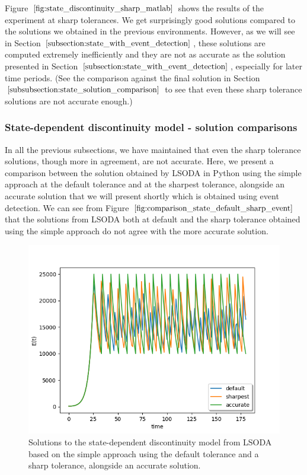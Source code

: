 Figure $\ref{fig:state_discontinuity_sharp_matlab}$ shows the results of the experiment at sharp tolerances. We get surprisingly good solutions compared to the solutions we obtained in the previous environments. However, as we will see in Section $\ref{subsection:state_with_event_detection}$, these solutions are computed extremely inefficiently and they are not as accurate as the solution presented in Section $\ref{subsection:state_with_event_detection}$, especially for later time periods. (See the comparison against the final solution in Section $\ref{subsubsection:state_solution_comparison}$ to see that even these sharp tolerance solutions are not accurate enough.)


\subsubsection{State-dependent discontinuity model - solution comparisons}
\label{subsubsection:state_solution_comparison}
In all the previous subsections, we have maintained that even the sharp tolerance solutions, though more in agreement, are not accurate. Here, we present a comparison between the solution obtained by LSODA in Python using the simple approach at the default tolerance and at the sharpest tolerance, alongside an accurate solution that we will present shortly which is obtained using event detection. We can see from Figure $\ref{fig:comparison_state_default_sharp_event}$ that the solutions from LSODA both at default and the sharp tolerance obtained using the simple approach do not agree with the more accurate solution. 

\begin{figure}[H]
\centering
\includegraphics[width=0.7\linewidth]{./figures/comparison_state_default_sharp_event}
\caption{Solutions to the state-dependent discontinuity model from LSODA based on the simple approach using the default tolerance and a sharp tolerance, alongside an accurate solution.}
\label{fig:comparison_state_default_sharp_event}
\end{figure}


